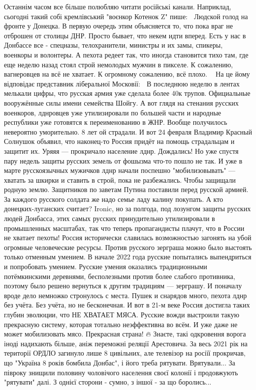 {%
Останнім часом все більше полюбляю читати російські канали. Наприклад, сьогодні такий собі кремлівський "воєнкор Котенок Z" пише:
💬 Людской голод на фронте у Донецка. В первую очередь этим объясняется то, что пока враг не отброшен от столицы ДНР. Просто бывает, что некем идти вперед. Есть у нас в Донбассе все - спецназы, телохранители, министры и их замы, спикеры, военкоры и волонтеры. А пехота редеет так, что иногда становится тихо там, где еще неделю назад стоял строй немолодых мужчин в пикселе. К сожалению, вагнеровцев на всё не хватает. К огромному сожалению, всё плохо.
🤷‍♂️ На це йому відповідає представник ліберальної Московії:
💬 В последнюю неделю в лентах мелькали цифры, что русская армия уже сделала более 40к трупов. Официальные вооружённые силы имени семейства Шойгу. А вот глядя на стенания русских военкоров, лднровцев уже утилизировали по большей части и народные республики уже готовятся к переименованию в ЖНР.
Вообще получилось невероятно уморительно.
8 лет ой страдали. И вот 24 февраля Владимир Красный Солнушок объявил, что наконец-то Россия придёт на помощь страдальцам и защитит их. Уряяя — прокричало население лднр. Дождались! Но уже спустя пару недель защиты русских земель от фошызма что-то пошло не так. И уже в марте русскоязычных мужичков лднр начали поспешно "мобилизовывать" — хватать за шкирки и ставить в строй, пока не разбежались. Чтобы защищали родную землю. Защитников по заветам Путина поставили перед русской армией. За каждого русского солдата же надо семье ладу калину покупать. А кто донецких-луганских считает? Ironic, но за полгода, под лозунгом защиты русских людей Донбасса, этих самых русских принудительно утилизировали в промышленных масштабах, так что теперь пропагандисты плачут, что в России не хватает пехоты!
Россия исторически славилась возможностью загонять на убой огромные человеческие ресурсы. Против русского зерграша можно было выстоять только отменным умением. В начале 2022 года русские попытались выпендриться и попробовать умением. Русские умения оказались традиционными потёмкинскими деревнями, бесполезными против более слабого противника, поэтому было решено вернуться к другим традициям — зерграшу. И поначалу вроде дело немножко стронулось с места. Пушек и снарядов много, пехота лднр без учёта. Без учёта, но не бесконечная.
И вот в 21-м веке Россия достигла таких глубин эволюции, что НЕ ХВАТАЕТ МЯСА. Русские вожди выстроили такую прекрасную систему, которая тотально неэффективна во всём. И уже даже не может мобилизовать мясо. Прекрасная страна!
🔥 Знаєте, такі одкровення ворога іноді надихають більше, аніж переможні реляції Арестовича. За весь 2021 рік на території ОРДЛО загинуло лише 8 цивільних, але телевізор на росіїї прокричав, що "Україна 8 років бомбила Донбас", і його треба рятувати. Врятували... За півроку знищили половину чоловічого населення своєї колонії і продовжують "рятувати" далі. З однієї сторони - сумно, з іншої - за що боролись...


}
